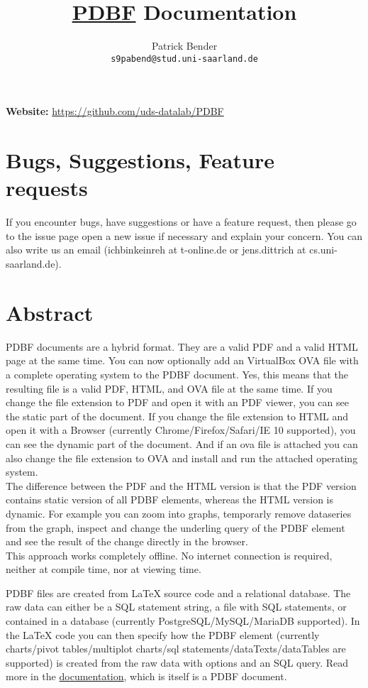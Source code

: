 \documentclass[11pt]{article}
\title{\href{https://github.com/uds-datalab/PDBF}{PDBF} Documentation}
\author{
 Patrick Bender\\
  \texttt{s9pabend@stud.uni-saarland.de}
}
\date{}
\begin{document}
\maketitle
\noindent \textbf{Website:} \url{https://github.com/uds-datalab/PDBF}\\
\noindent \textbf{}

\tableofcontents
\newpage

\section{Bugs, Suggestions, Feature requests}
If you encounter bugs, have suggestions or have a feature request, then please go to the issue page open a new issue if necessary and explain your concern. You can also write us an email (ichbinkeinreh at t-online.de or jens.dittrich at cs.uni-saarland.de).

\section{Abstract}
PDBF documents are a hybrid format. They are a valid PDF and a valid HTML page at the same time. You can now optionally add an VirtualBox OVA file with a complete operating system to the PDBF document. Yes, this means that the resulting file is a valid PDF, HTML, and OVA file at the same time. If you change the file extension to PDF and open it with an PDF viewer, you can see the static part of the document. If you change the file extension to HTML and open it with a Browser (currently Chrome/Firefox/Safari/IE 10 supported), you can see the dynamic part of the document. And if an ova file is attached you can also change the file extension to OVA and install and run the attached operating system.\\
The difference between the PDF and the HTML version is that the PDF version contains static version of all PDBF elements, whereas the HTML version is dynamic. For example you can zoom into graphs, temporarly remove dataseries from the graph, inspect and change the underling query of the PDBF element and see the result of the change directly in the browser.\\
This approach works completely offline. No internet connection is required, neither at compile time, nor at viewing time.

\noindent PDBF files are created from LaTeX source code and a relational database. The raw data can either be a SQL statement string, a file with SQL statements, or contained in a database (currently PostgreSQL/MySQL/MariaDB supported). In the LaTeX code you can then specify how the PDBF element (currently charts/pivot tables/multiplot charts/sql statements/dataTexts/dataTables are supported) is created from the raw data with options and an SQL query. Read more in the \href{http://uds-datalab.github.io/PDBF/}{documentation}, which is itself is a PDBF document.\\
\end{document}
